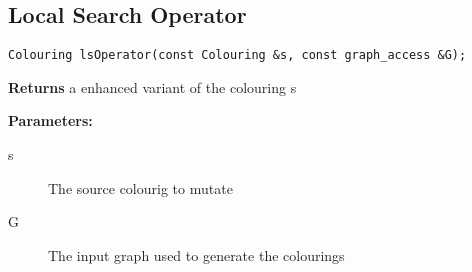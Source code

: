 \documentclass{scrartcl}
\begin{document}
\subsection{Local Search Operator}

\begin{verbatim}
Colouring lsOperator(const Colouring &s, const graph_access &G);
\end{verbatim}

\textbf{Returns} a enhanced variant of the colouring s 

\textbf{Parameters:}
\begin{description}
	\item[s] The source colourig to mutate
	\item[G] The input graph used to generate the colourings
\end{description}
\end{document}
